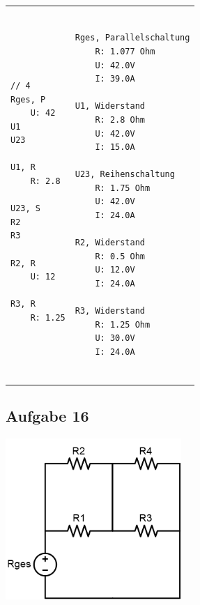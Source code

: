 \documentclass[a4paper,10pt,ngerman]{scrartcl}
\begin{document}
\begin{tabular}{p{}p{}}
\raggedright
\begin{verbatim}

// 4
Rges, P
    U: 42
U1
U23

U1, R
    R: 2.8

U23, S
R2
R3

R2, R
    U: 12

R3, R
    R: 1.25

\end{verbatim}   &
\raggedleft
\begin{verbatim}

Rges, Parallelschaltung
    R: 1.077 Ohm
    U: 42.0V
    I: 39.0A

U1, Widerstand
    R: 2.8 Ohm
    U: 42.0V
    I: 15.0A

U23, Reihenschaltung
    R: 1.75 Ohm
    U: 42.0V
    I: 24.0A

R2, Widerstand
    R: 0.5 Ohm
    U: 12.0V
    I: 24.0A

R3, Widerstand
    R: 1.25 Ohm
    U: 30.0V
    I: 24.0A


\end{verbatim}
\end{tabular}

\subsection{Aufgabe 16}

\includegraphics[width=0.5\textwidth]{circuit7.png}
\end{document}
